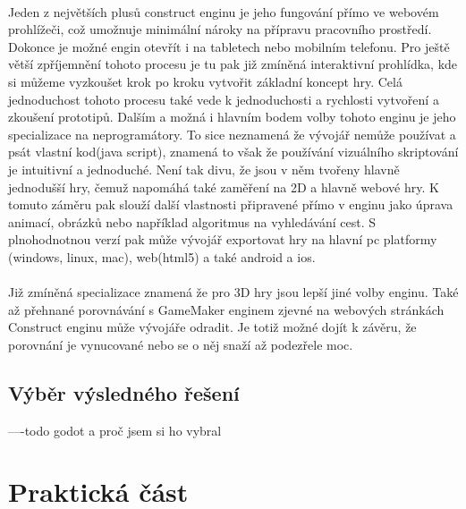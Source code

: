 
\paragraph{}
	Jeden z největších plusů construct enginu je jeho fungování přímo ve webovém prohlížeči, což umožnuje  minimální nároky na přípravu pracovního prostředí.
	Dokonce je možné engin otevřít i na tabletech nebo mobilním telefonu.
	Pro ještě větší zpříjemnění tohoto procesu je tu pak již zmíněná interaktivní prohlídka, kde si můžeme vyzkoušet krok po kroku vytvořit základní koncept hry.
	Celá jednoduchost tohoto procesu také vede k jednoduchosti a rychlosti vytvoření a zkoušení prototipů.
	Dalším a možná i hlavním bodem volby tohoto enginu je jeho specializace na neprogramátory.
	To sice neznamená že vývojář nemůže používat a psát vlastní kod(java script), znamená to však že používání vizuálního skriptování je intuitivní a jednoduché.
	Není tak divu, že jsou v něm tvořeny hlavně jednodušší hry, čemuž napomáhá také zaměření na 2D a hlavně webové hry.
	K tomuto záměru pak slouží další vlastnosti připravené přímo v enginu jako úprava animací, obrázků nebo například algoritmus na vyhledávání cest.
	S plnohodnotnou verzí pak může vývojář exportovat hry na hlavní pc platformy (windows, linux, mac), web(html5) a také android a ios.

\paragraph{}
	Již zmíněná specializace znamená že pro 3D hry jsou lepší jiné volby enginu.
	Také až přehnané porovnávání s GameMaker enginem zjevné na webových stránkách Construct enginu může vývojáře odradit.
	Je totiž možné dojít k závěru, že porovnání je vynucované nebo se o něj snaží až podezřele moc.


\subsection{Výběr výsledného řešení}
----todo \linebreak godot a proč jsem si ho vybral


\section{Praktická část}



